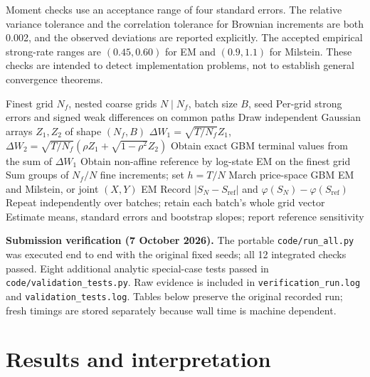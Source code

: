 Moment checks use an acceptance range of four standard errors. The relative variance tolerance and the correlation tolerance for Brownian increments are both 0.002, and the observed deviations are reported explicitly. The accepted empirical strong-rate ranges are $(0.45,0.60)$ for EM and $(0.9,1.1)$ for Milstein. These checks are intended to detect implementation problems, not to establish general convergence theorems.

\begin{algorithm}[H]
\caption{One batch of coupled GBM and non-affine convergence measurements}
\begin{algorithmic}[1]
\Require Finest grid $N_f$, nested coarse grids $N\mid N_f$, batch size $B$, seed
\Ensure Per-grid strong errors and signed weak differences on common paths
\State Draw independent Gaussian arrays $Z_1,Z_2$ of shape $(N_f,B)$
\State $\Delta W_1=\sqrt{T/N_f}Z_1$, $\Delta W_2=\sqrt{T/N_f}(\rho Z_1+\sqrt{1-\rho^2}Z_2)$
\State Obtain exact GBM terminal values from the sum of $\Delta W_1$
\State Obtain non-affine reference by log-state EM on the finest grid
\State Sum groups of $N_f/N$ fine increments; set $h=T/N$
\State March price-space GBM EM and Milstein, or joint $(X,Y)$ EM
\State Record $|S_N-S_{\mathrm{ref}}|$ and $\varphi(S_N)-\varphi(S_{\mathrm{ref}})$
\EndFor
\State Repeat independently over batches; retain each batch's whole grid vector
\State Estimate means, standard errors and bootstrap slopes; report reference sensitivity
\end{algorithmic}
\end{algorithm}
\textbf{Submission verification (7 October 2026).} The portable \texttt{code/run\_all.py} was executed end to end with the original fixed seeds; all 12 integrated checks passed. Eight additional analytic special-case tests passed in \texttt{code/validation\_tests.py}. Raw evidence is included in \texttt{verification\_run.log} and \texttt{validation\_tests.log}. Tables below preserve the original recorded run; fresh timings are stored separately because wall time is machine dependent.

\section{Results and interpretation}
\label{sec:results}
